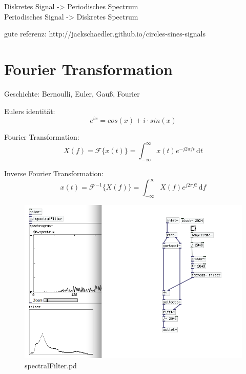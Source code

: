 Diskretes Signal -> Periodisches Spectrum \\
Periodisches Signal -> Diskretes Spectrum

gute referenz:
http://jackschaedler.github.io/circles-sines-signals




\section{Fourier Transformation}

Geschichte:
Bernoulli, Euler, Gauß, Fourier

Eulers identität:
\begin{equation}
	e ^{ix} = cos(x)+i \cdot sin(x)
\end{equation}

Fourier Transformation:\\
\begin{equation}
	X(f)= \mathcal{F} \{x(t)\} = \int_{-\infty}^\infty \! x(t) e^{-j2\pi ft} \, \mathrm{d}t
\end{equation}

Inverse Fourier Transformation:\\
\begin{equation}
	x(t)= \mathcal{F}^{-1} \{X(f)\} = \int_{-\infty}^\infty \! X(f) e^{j2\pi ft} \, \mathrm{d}f
\end{equation}

\begin{figure}[h]
	\begin{center}
		\includegraphics[width = 14cm]{img/spectralFilter.png}
		\caption{spectralFilter.pd}
		\label{fig:spectralFilter}
	\end{center}
\end{figure}

